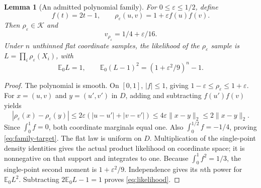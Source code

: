\documentclass[11pt]{article}
\newtheorem{lemma}[theorem]{Lemma}
\theoremstyle{remark}
\newcommand{\K}{\mathcal K}
\newcommand{\E}{\mathbb E}
\begin{document}
\begin{lemma}[An admitted polynomial family]\label{lem:family}
For $0\le\varepsilon\le1/2$, define
\[
 f(t)=2t-1,\qquad
 \rho_\varepsilon(u,v)=1+\varepsilon f(u)f(v).
\]
Then $\rho_\varepsilon\in\K$ and
\begin{equation}\label{eq:family-target}
 v_{\rho_\varepsilon}=1/4+\varepsilon/16.
\end{equation}
Under $n$ unthinned flat coordinate samples, the likelihood of the
$\rho_\varepsilon$ sample is $L=\prod_i\rho_\varepsilon(X_i)$, with
\begin{equation}\label{eq:likelihood}
 \E_0L=1,\qquad \E_0(L-1)^2=(1+\varepsilon^2/9)^n-1.
\end{equation}
\end{lemma}
\begin{proof}
The polynomial is smooth. On $[0,1]$, $|f|\le1$, giving
$1-\varepsilon\le\rho_\varepsilon\le1+\varepsilon$.
For $x=(u,v)$ and $y=(u',v')$ in $D$, adding and subtracting
$f(u')f(v)$ yields
\[
 |\rho_\varepsilon(x)-\rho_\varepsilon(y)|
 \le2\varepsilon(|u-u'|+|v-v'|)
 \le4\varepsilon\|x-y\|_2\le2\|x-y\|_2.
\]
Since $\int_0^1 f=0$, both coordinate marginals equal one.
Also $\int_0^{1/2}f=-1/4$, proving \eqref{eq:family-target}.
The flat law is uniform on $D$. Multiplication of the single-point
density identities gives the actual product likelihood on coordinate
space; it is nonnegative on that support and integrates to one.
Because $\int_0^1f^2=1/3$, the single-point second moment is
$1+\varepsilon^2/9$. Independence gives its $n$th power for $\E_0L^2$.
Subtracting $2\E_0L-1=1$ proves \eqref{eq:likelihood}.
\end{proof}
\end{document}
